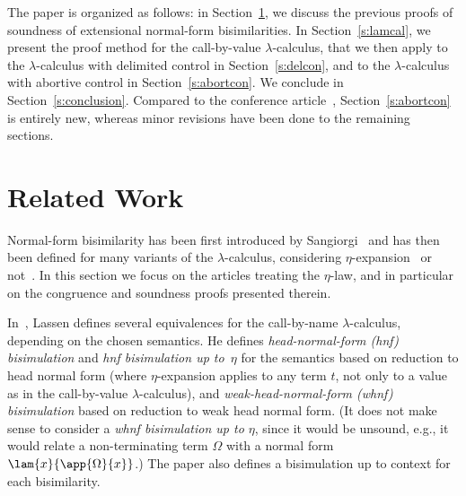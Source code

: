 \documentclass{lmcs}
\theoremstyle{defC}
\begin{document}
The paper is organized as follows: in Section~\ref{s:relwork}, we discuss the
previous proofs of soundness of extensional normal-form bisimilarities. In
Section~\ref{s:lamcal}, we present the proof method for the call-by-value
$\lambda$-calculus, that we then apply to the $\lambda$-calculus with delimited
control in Section~\ref{s:delcon}, and to the $\lambda$-calculus with abortive
control in Section~\ref{s:abortcon}. We conclude in Section~\ref{s:conclusion}.
Compared to the conference article~\cite{Biernacki-al:MFPS17},
Section~\ref{s:abortcon} is entirely new, whereas minor revisions have been done
to the remaining sections.

\section{Related Work}%
\label{s:relwork}

Normal-form bisimilarity has been first introduced by
Sangiorgi~\cite{Sangiorgi:LICS92} and has then been defined for many variants of
the $\lambda$-calculus, considering
$\eta$-expansion~\cite{Lassen:MFPS99,Lassen:LICS05,Lassen:LICS06,
  Stoevring-Lassen:POPL07,Lassen-Levy:CSL07,Lassen-Levy:LICS08,
  Biernacki-Lenglet:FLOPS12,Biernacki-al:HAL15} or
not~\cite{Lassen:99,Lassen:MFPS05}. In this section we focus on the articles
treating the $\eta$-law, and in particular on the congruence and soundness
proofs presented therein.

In~\cite{Lassen:MFPS99}, Lassen defines several equivalences for the
call-by-name $\lambda$-calculus, depending on the chosen semantics. He defines
\emph{head-normal-form (hnf) bisimulation} and \emph{hnf bisimulation up
  to~$\eta$} for the semantics based on reduction to head normal form (where
$\eta$-expansion applies to any term $t$, not only to a value as in the
call-by-value $\lambda$-calculus), and \emph{weak-head-normal-form (whnf)
  bisimulation} based on reduction to weak head normal form. (It does not make
sense to consider a \emph{whnf bisimulation up to $\eta$}, since it would be
unsound, e.g., it would relate a non-terminating term $\Omega$ with a normal
form $\lam{x}{\app{\Omega}{x}}$.)
The paper also defines a bisimulation up to context for each
bisimilarity.
\end{document}
